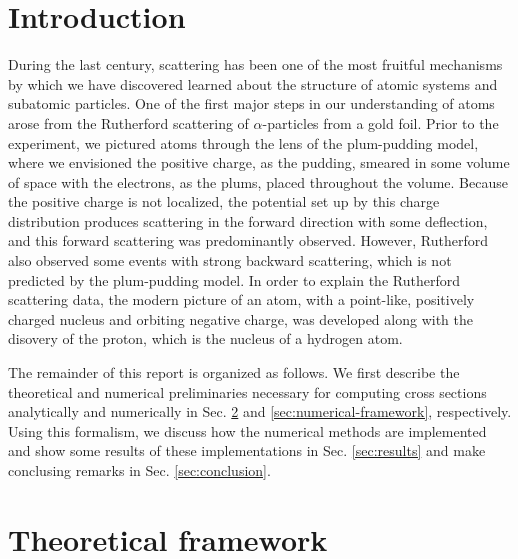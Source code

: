 
\def\HWnum{Project 2}
\def\duedate{October 27, 2024}




\section{Introduction}
\label{sec:introduction}

During the last century, scattering has been one of the most fruitful mechanisms by which we have discovered learned about the structure of atomic systems and subatomic particles.
One of the first major steps in our understanding of atoms arose from the Rutherford scattering of $\alpha$-particles from a gold foil.
Prior to the experiment, we pictured atoms through the lens of the plum-pudding model, where we envisioned the positive charge, as the pudding, smeared in some volume of space with the electrons, as the plums, placed throughout the volume.
Because the positive charge is not localized, the potential set up by this charge distribution produces scattering in the forward direction with some deflection, and this forward scattering was predominantly observed.
However, Rutherford also observed some events with strong backward scattering, which is not predicted by the plum-pudding model.
In order to explain the Rutherford scattering data, the modern picture of an atom, with a point-like, positively charged nucleus and orbiting negative charge, was developed along with the disovery of the proton, which is the nucleus of a hydrogen atom.

The remainder of this report is organized as follows.
We first describe the theoretical and numerical preliminaries necessary for computing cross sections analytically and numerically in Sec. \ref{sec:theoretical-framework} and \ref{sec:numerical-framework}, respectively.
Using this formalism, we discuss how the numerical methods are implemented and show some results of these implementations in Sec. \ref{sec:results} and make conclusing remarks in Sec. \ref{sec:conclusion}.

\section{Theoretical framework}
\label{sec:theoretical-framework}

